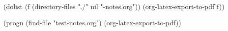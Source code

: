 \documentclass[11pt]{article}
\author{Christopher Simpkins}
\date{\today}
\title{}
\begin{document}
\tableofcontents

(dolist (f (directory-files "./" nil "-notes.org"))
  (org-latex-export-to-pdf f))

(progn
  (find-file "test-notes.org")
  (org-latex-export-to-pdf))
\end{document}
